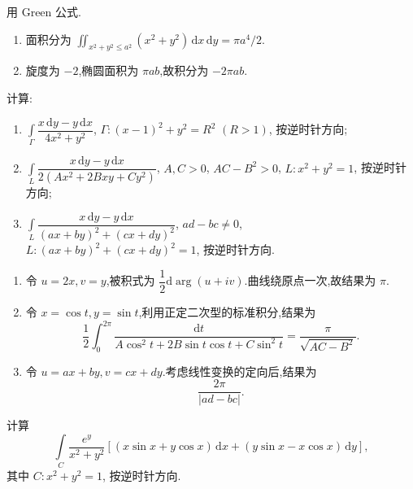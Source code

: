 \begin{solution}
    用 Green 公式.
    \begin{enumerate}
        \item 面积分为 $\displaystyle\iint_{x^2+y^2\leq a^2}(x^2+y^2)\,\mathrm{d}x\,\mathrm{d}y=\pi a^4/2$.
        \item 旋度为 $-2$,椭圆面积为 $\pi ab$,故积分为 $-2\pi ab$.
    \end{enumerate}
\end{solution}

\begin{example}
    计算:
    \begin{enumerate}
        \item $\displaystyle\int\limits_\Gamma\dfrac{x\,\mathrm{d}y-y\,\mathrm{d}x}{4x^2+y^2}$, $\Gamma:(x-1)^2+y^2=R^2$ $(R>1)$, 按逆时针方向;
        \item $\displaystyle\int\limits_L\dfrac{x\,\mathrm{d}y-y\,\mathrm{d}x}{2(Ax^2+2Bxy+Cy^2)}$, $A,C>0$, $AC-B^2>0$, $L:x^2+y^2=1$, 按逆时针方向;
        \item $\displaystyle\int\limits_L\dfrac{x\,\mathrm{d}y-y\,\mathrm{d}x}{(ax+by)^2+(cx+dy)^2}$, $ad-bc\ne0$, $L:(ax+by)^2+(cx+dy)^2=1$, 按逆时针方向.
    \end{enumerate}
\end{example}
\exampleblank

\begin{solution}
    \leavevmode
    \begin{enumerate}
        \item 令 $u=2x,v=y$,被积式为 $\dfrac{1}{2}\mathrm{d}\arg(u+iv)$.曲线绕原点一次,故结果为 $\pi$.
        \item 令 $x=\cos t,y=\sin t$,利用正定二次型的标准积分,结果为
              \[
                  \dfrac{1}{2}\int_0^{2\pi}\dfrac{\mathrm{d}t}{A\cos^2t+2B\sin t\cos t+C\sin^2t}
                  =\dfrac{\pi}{\sqrt{AC-B^2}}.
              \]
        \item 令 $u=ax+by,v=cx+dy$.考虑线性变换的定向后,结果为
              \[
                  \dfrac{2\pi}{|ad-bc|}.
              \]
    \end{enumerate}
\end{solution}

\begin{example}
    计算
    \[
        \displaystyle\int\limits_C\dfrac{e^y}{x^2+y^2}
        \left\lbrack (x\sin x+y\cos x)\,\mathrm{d}x+(y\sin x-x\cos x)\,\mathrm{d}y\right\rbrack,
    \]
    其中 $C:x^2+y^2=1$, 按逆时针方向.
\end{example}
\exampleblank

